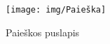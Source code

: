 \documentclass{VUMIFPSbakalaurinis}
\begin{document}
\begin{figure}[H]
    \centering
    \texttt{[image: img/Paieška]}
    \caption{Paieškos puslapis}
    \label{img:PaieškaPuslapis}
\end{figure}


\end{document}
